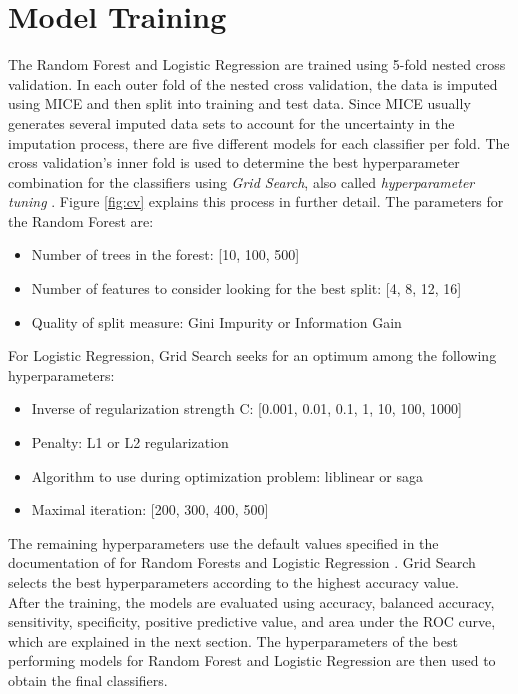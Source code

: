 \section{Model Training}
The Random Forest and Logistic Regression are trained using 5-fold nested cross 
validation.
In each outer fold of the nested cross validation, the data is imputed using 
MICE and then split into training and test data. Since MICE usually generates 
several imputed data sets to account for the uncertainty in the imputation 
process, there are five different models for each classifier per fold. The 
cross validation's inner fold is used to determine the best hyperparameter 
combination for the classifiers using \textit{Grid Search}, also called 
\textit{hyperparameter tuning} \cite{RN191}. Figure \ref{fig:cv} explains this 
process in further detail. The parameters for the Random Forest are:
\begin{itemize}
 \item Number of trees in the forest: [10, 100, 500]
 \item Number of features to consider looking for the best split: [4, 8, 12, 16]
 \item Quality of split measure: Gini Impurity or Information Gain
\end{itemize}
For Logistic Regression, Grid Search seeks for an optimum among the 
following hyperparameters:
\begin{itemize}
 \item Inverse of regularization strength C: [0.001, 0.01, 0.1, 1, 10, 100, 
1000]
 \item Penalty: L1 or L2 regularization
 \item Algorithm to use during optimization problem: liblinear or saga
 \item Maximal iteration: [200, 300, 400, 500]
\end{itemize}
The remaining hyperparameters use the default values specified in the 
documentation of  for Random Forests and Logistic Regression 
\cite{RN191}.
Grid Search selects the best hyperparameters according to the highest accuracy 
value.
\\
After the training, the models are evaluated using accuracy, balanced 
accuracy, sensitivity, 
specificity, positive predictive value, and area under the ROC curve, which are 
explained in the next section.
The hyperparameters of the best performing models for Random Forest and 
Logistic Regression are then used to obtain the final classifiers.
